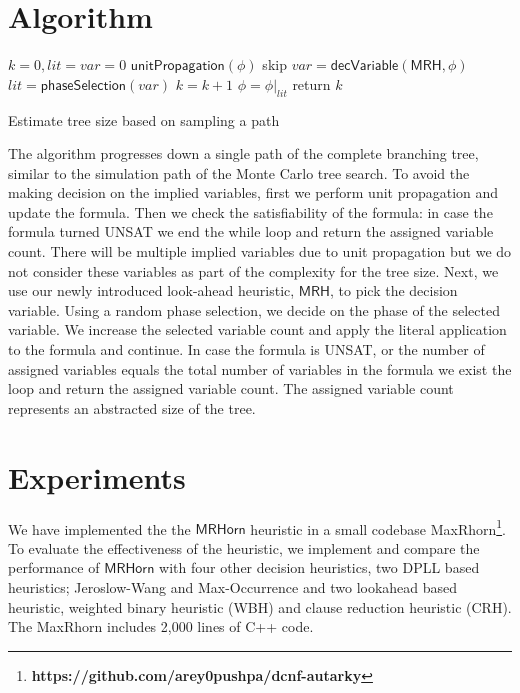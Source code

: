 \documentclass[runningheads]{llncs}
\newcommand{\FFF}{\Phi}
\newcommand{\rhorn}{\mathsf{MRHorn}}
\newcommand{\mrh}{\mathsf{MRH}}
\newcommand{\dtheight}{\mathsf{DecisionTreeHeight}}
\def\maxrhorn{{\sf MaxRhorn}\xspace}
\def\uprop{\mathsf{unitPropagation}}
\def\dvar{\mathsf{decVariable}}
\def\psel{\mathsf{phaseSelection}}
\begin{document}
\section{Algorithm} \label{sec:algorithm}
%	
%    


\begin{algorithm}[t!]
	\DontPrintSemicolon
	$k = 0, lit = var = 0$ \;
	 {  
		$\uprop(\phi)$ \; 
		 {skip}
		$var = \dvar (\mrh, \phi)$ \;
		$lit = \psel (var)$ \;
		$k = k + 1$ \; 
	    $\phi = {\phi|}_{lit}$	
	}
	return $k$ 
	\caption{Estimate tree size based on sampling a path}
	\label{algo:mrhorn}
\end{algorithm}
The algorithm progresses down a single path of the complete branching tree, similar to the simulation path of the Monte Carlo tree search. To avoid the making decision on the implied variables, first we perform unit propagation and update the formula. Then we check the satisfiability of the formula: in case the formula turned UNSAT we end the while loop and return the assigned variable count. There will be multiple implied variables due to unit propagation but we do not consider these variables as part of the complexity for the tree size.
Next, we use our newly introduced look-ahead heuristic, $\mrh$, to pick the decision variable. Using a random phase selection, we decide on the phase of the selected variable. We increase the selected variable count and apply the literal application to the formula and continue. In case the formula is UNSAT, or the number of assigned variables equals the total number of variables in the formula we exist the loop and return the assigned variable count. The assigned variable count represents an abstracted size of the tree.
\section{Experiments} \label{sec:experiments}
We have implemented the the $\rhorn$ heuristic in a small codebase \maxrhorn \footnote{\textbf{https://github.com/arey0pushpa/dcnf-autarky}}. To evaluate the effectiveness of the heuristic, we implement and compare the performance of $\rhorn$ with four other decision heuristics, two DPLL based heuristics; Jeroslow-Wang and Max-Occurrence and two lookahead based heuristic, weighted binary heuristic (WBH) and clause reduction heuristic (CRH). The \maxrhorn includes 2,000 lines of C++ code.
\end{document}
